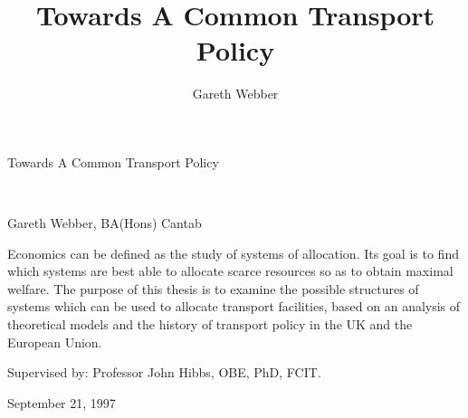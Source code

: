 \documentclass[11pt]{report}
\begin{document}
\begin{titlepage}
\pagecolor{titlepagecolor}\color{white}
{\noindent \titlefont \LARGE Towards A Common Transport Policy}\title{Towards A Common Transport Policy}\\
\makebox[0pt][l]{\rule{1.3\textwidth}{2pt}}
\par {\noindent \titlefont \textcolor{namecolor}{Gareth Webber, BA(Hons) Cantab}}\author{Gareth Webber}
\vskip 3cm
{\noindent \titlefont  Economics can be defined as the study of systems of allocation. Its goal is to find which systems are best able to allocate scarce resources so as to obtain maximal welfare. The purpose of this thesis is to examine the possible structures of systems which can be used to allocate transport facilities, based on an analysis of theoretical models and the history of transport policy in the UK and the European Union.}
\par {\noindent  \textcolor{namecolor}{Supervised by: Professor John Hibbs, OBE, PhD, FCIT.}}
\par {\noindent  \textcolor{namecolor}{September 21, 1997}}
\end{titlepage}
\restoregeometry 
\pagecolor{white}



	
		






\end{document}
